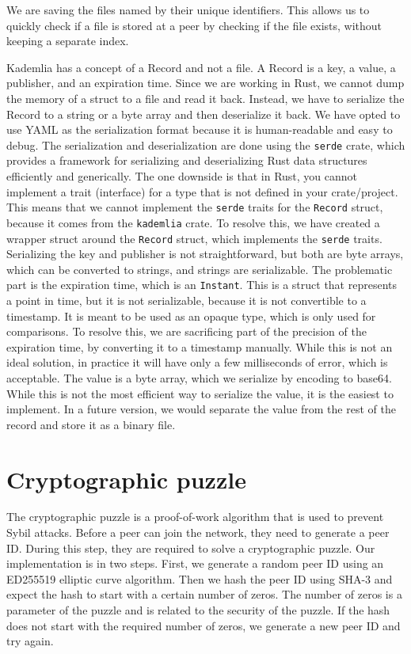 We are saving the files named by their unique identifiers.
This allows us to quickly check if a file is stored at a peer by checking if the file exists, without keeping a separate index.

Kademlia has a concept of a Record and not a file.
A Record is a key, a value, a publisher, and an expiration time.
Since we are working in Rust, we cannot dump the memory of a struct to a file and read it back.
Instead, we have to serialize the Record to a string or a byte array and then deserialize it back.
We have opted to use YAML as the serialization format because it is human-readable and easy to debug.
The serialization and deserialization are done using the \texttt{serde} crate, which provides a framework for serializing and deserializing Rust data structures efficiently and generically.
The one downside is that in Rust, you cannot implement a trait (interface) for a type that is not defined in your crate/project.
This means that we cannot implement the \texttt{serde} traits for the \texttt{Record} struct, because it comes from the \texttt{kademlia} crate.
To resolve this, we have created a wrapper struct around the \texttt{Record} struct, which implements the \texttt{serde} traits.
Serializing the key and publisher is not straightforward, but both are byte arrays, which can be converted to strings, and strings are serializable.
The problematic part is the expiration time, which is an \texttt{Instant}.
This is a struct that represents a point in time, but it is not serializable, because it is not convertible to a timestamp.
It is meant to be used as an opaque type, which is only used for comparisons.
To resolve this, we are sacrificing part of the precision of the expiration time, by converting it to a timestamp manually.
While this is not an ideal solution, in practice it will have only a few milliseconds of error, which is acceptable.
The value is a byte array, which we serialize by encoding to base64.
While this is not the most efficient way to serialize the value, it is the easiest to implement.
In a future version, we would separate the value from the rest of the record and store it as a binary file.

\section{Cryptographic puzzle}

The cryptographic puzzle is a proof-of-work algorithm that is used to prevent Sybil attacks.
Before a peer can join the network, they need to generate a peer ID.
During this step, they are required to solve a cryptographic puzzle.
Our implementation is in two steps.
First, we generate a random peer ID using an ED255519 elliptic curve algorithm.
Then we hash the peer ID using SHA-3 and expect the hash to start with a certain number of zeros.
The number of zeros is a parameter of the puzzle and is related to the security of the puzzle.
If the hash does not start with the required number of zeros, we generate a new peer ID and try again.

